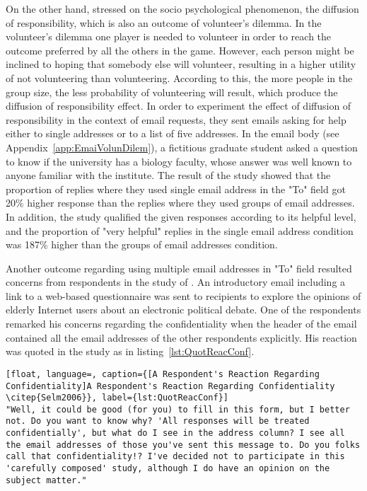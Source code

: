 On the other hand, \cite{Barron2002} stressed on the socio psychological phenomenon, the diffusion of responsibility, which is also an outcome of volunteer's dilemma. In the volunteer's dilemma one player is needed to volunteer in order to reach the outcome preferred by all the others in the game. However, each person might be inclined to hoping that somebody else will volunteer, resulting in a higher utility of not volunteering than volunteering. According to this, the more people in the group size, the less probability of volunteering will result, which produce the diffusion of responsibility effect. In order to experiment the effect of diffusion of responsibility in the context of email requests, they sent emails asking for help either to single addresses or to a list of five addresses. In the email body (see Appendix~\ref{app:EmaiVolunDilem}), a fictitious graduate student asked a question to know if the university has a biology faculty, whose answer was well known to anyone familiar with the institute. The result of the study showed that the proportion of replies where they used single email address in the "To" field got 20\% higher response than the replies where they used groups of email addresses. In addition, the study qualified the given responses according to its helpful level, and the proportion of "very helpful" replies in the single email address condition was 187\% higher than the groups of email addresses condition.
\vspace{1cm}

Another outcome regarding using multiple email addresses in "To" field resulted concerns from respondents in the study of \cite{Selm2006}. An introductory email including a link to a web-based questionnaire was sent to recipients to explore the opinions of elderly Internet users about an electronic political debate. One of the respondents remarked his concerns regarding the confidentiality when the header of the email contained all the email addresses of the other respondents explicitly. His reaction was quoted in the study as in listing~\ref{lst:QuotReacConf}.
\vspace{1cm}


\begin{lstlisting}[float, language=, caption={[A Respondent's Reaction Regarding Confidentiality]A Respondent's Reaction Regarding Confidentiality \citep{Selm2006}}, label={lst:QuotReacConf}]
"Well, it could be good (for you) to fill in this form, but I better not. Do you want to know why? 'All responses will be treated confidentially', but what do I see in the address column? I see all the email addresses of those you've sent this message to. Do you folks call that confidentiality!? I've decided not to participate in this 'carefully composed' study, although I do have an opinion on the subject matter."
\end{lstlisting}

